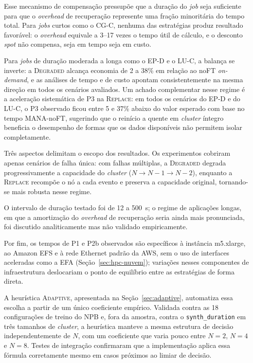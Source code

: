 Esse mecanismo de compensação pressupõe que a duração do \textit{job} seja
suficiente para que o \textit{overhead} de recuperação represente uma fração
minoritária do tempo total. Para \textit{jobs} curtos como o CG-C, nenhuma das
estratégias produz resultado favorável: o \textit{overhead} equivale a 3--17
vezes o tempo útil de cálculo, e o desconto \textit{spot} não compensa, seja em
tempo seja em custo.

Para \textit{jobs} de duração moderada a longa como o EP-D e o LU-C, a balança
se inverte: a \textsc{Degraded} alcança economia de 2 a 38\% em relação ao noFT
\textit{on-demand}, e as análises de tempo e de custo apontam consistentemente
na mesma direção em todos os cenários avaliados. Um achado complementar nesse
regime é a aceleração sistemática de P3 na \textsc{Replace}: em todos os
cenários do EP-D e do LU-C, o P3 observado ficou entre 5 e 37\% abaixo do valor
esperado com base no tempo MANA-noFT, sugerindo que o reinício a quente em
\textit{cluster} íntegro beneficia o desempenho de formas que os dados
disponíveis não permitem isolar completamente.

Três aspectos delimitam o escopo dos resultados. Os experimentos cobriram
apenas cenários de falha única: com falhas múltiplas, a \textsc{Degraded}
degrada progressivamente a capacidade do \textit{cluster}
($N \rightarrow N\!-\!1 \rightarrow N\!-\!2$), enquanto a \textsc{Replace}
recompõe o nó a cada evento e preserva a capacidade original, tornando-se mais
robusta nesse regime.

O intervalo de duração testado foi de 12 a 500~s; o regime de aplicações
longas, em que a amortização do \textit{overhead} de recuperação seria ainda
mais pronunciada, foi discutido analiticamente mas não validado empiricamente.

Por fim, os tempos de P1 e P2b observados são específicos à instância
m5.xlarge, ao Amazon EFS e à rede Ethernet padrão da AWS, sem o uso de
interfaces aceleradas como a EFA (Seção~\ref{sec:hpc-nuvem}); variações nesses
componentes de infraestrutura deslocariam o ponto de equilíbrio entre as
estratégias de forma direta.

A heurística \textsc{Adaptive}, apresentada na Seção~\ref{sec:adaptive},
automatiza essa escolha a partir de um único coeficiente empírico. Validada
contra as 18 configurações de treino do NPB e, fora da amostra, contra o
\texttt{synth\_duration} em três tamanhos de \textit{cluster}, a heurística
manteve a mesma estrutura de decisão independentemente de $N$, com um
coeficiente que varia pouco entre $N=2$, $N=4$ e $N=8$. Testes de integração
confirmaram que a implementação aplica essa fórmula corretamente mesmo em
casos próximos ao limiar de decisão.

